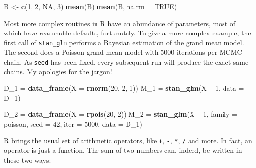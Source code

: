 \documentclass[]{svmono}
\newenvironment{Shaded}{\begin{snugshade}}{\end{snugshade}}
\newcommand{\KeywordTok}[1]{\textcolor[rgb]{0.13,0.29,0.53}{\textbf{#1}}}
\newcommand{\DataTypeTok}[1]{\textcolor[rgb]{0.13,0.29,0.53}{#1}}
\newcommand{\DecValTok}[1]{\textcolor[rgb]{0.00,0.00,0.81}{#1}}
\newcommand{\StringTok}[1]{\textcolor[rgb]{0.31,0.60,0.02}{#1}}
\newcommand{\OtherTok}[1]{\textcolor[rgb]{0.56,0.35,0.01}{#1}}
\newcommand{\OperatorTok}[1]{\textcolor[rgb]{0.81,0.36,0.00}{\textbf{#1}}}
\newcommand{\NormalTok}[1]{#1}
\theoremstyle{definition}
\theoremstyle{definition}
\theoremstyle{definition}
\theoremstyle{remark}
\begin{document}
\begin{Shaded}
\begin{Highlighting}[]
\NormalTok{B <-}\StringTok{ }\KeywordTok{c}\NormalTok{(}\DecValTok{1}\NormalTok{, }\DecValTok{2}\NormalTok{, }\OtherTok{NA}\NormalTok{, }\DecValTok{3}\NormalTok{)}
\KeywordTok{mean}\NormalTok{(B)}
\KeywordTok{mean}\NormalTok{(B, }\DataTypeTok{na.rm =} \OtherTok{TRUE}\NormalTok{)}
\end{Highlighting}
\end{Shaded}

Most more complex routines in R have an abundance of parameters, most of
which have reasonable defaults, fortunately. To give a more complex
example, the first call of \texttt{stan\_glm} performs a Bayesian
estimation of the grand mean model. The second does a Poisson grand mean
model with 5000 iterations per MCMC chain. As \texttt{seed} has been
fixed, every subsequent run will produce the exact same chains. My
apologies for the jargon!

\begin{Shaded}
\begin{Highlighting}[]
\NormalTok{D_}\DecValTok{1}\NormalTok{ =}\StringTok{ }\KeywordTok{data_frame}\NormalTok{(}\DataTypeTok{X =} \KeywordTok{rnorm}\NormalTok{(}\DecValTok{20}\NormalTok{, }\DecValTok{2}\NormalTok{, }\DecValTok{1}\NormalTok{))}
\NormalTok{M_}\DecValTok{1}\NormalTok{ =}\StringTok{ }\KeywordTok{stan_glm}\NormalTok{(X }\OperatorTok{~}\StringTok{ }\DecValTok{1}\NormalTok{, }
               \DataTypeTok{data =}\NormalTok{ D_}\DecValTok{1}\NormalTok{)}

\NormalTok{D_}\DecValTok{2}\NormalTok{ =}\StringTok{ }\KeywordTok{data_frame}\NormalTok{(}\DataTypeTok{X =} \KeywordTok{rpois}\NormalTok{(}\DecValTok{20}\NormalTok{, }\DecValTok{2}\NormalTok{))}
\NormalTok{M_}\DecValTok{2}\NormalTok{ =}\StringTok{ }\KeywordTok{stan_glm}\NormalTok{(X }\OperatorTok{~}\StringTok{ }\DecValTok{1}\NormalTok{,}
               \DataTypeTok{family =}\NormalTok{ poisson,}
               \DataTypeTok{seed =} \DecValTok{42}\NormalTok{,}
               \DataTypeTok{iter =} \DecValTok{5000}\NormalTok{,}
               \DataTypeTok{data =}\NormalTok{ D_}\DecValTok{1}\NormalTok{)}
\end{Highlighting}
\end{Shaded}

R brings the usual set of arithmetic operators, like \texttt{+},
\texttt{-}, \texttt{*}, \texttt{/} and more. In fact, an operator is
just a function. The sum of two numbers can, indeed, be written in these
two ways:
\end{document}
